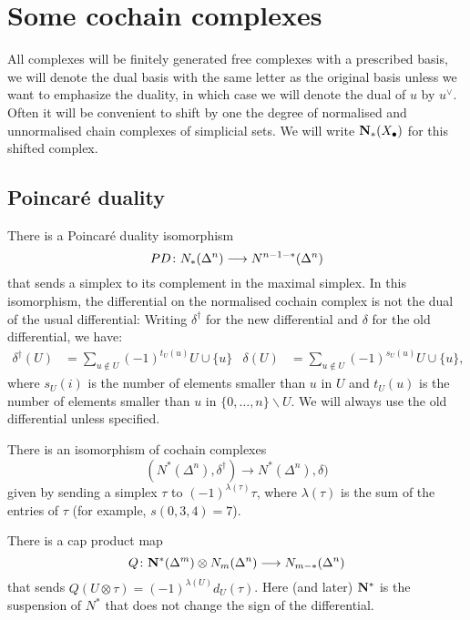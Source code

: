 
\section{Some cochain complexes}


All complexes will be finitely generated free complexes with a prescribed basis, we will denote the dual basis with the same letter as the original basis unless we want to emphasize the duality, in which case we will denote the dual of $u$ by $u^\vee$. Often it will be convenient to shift by one the degree of normalised and unnormalised chain complexes of simplicial sets. We will write $\mathbf{N}_*(X_\bullet)$ for this shifted complex.

\subsection{Poincaré duality}
There is a Poincaré duality isomorphism
\[PD\colon N_*(\Delta^n)\longrightarrow N^{n-1-*}(\Delta^n)\]
that sends a simplex to its complement in the maximal simplex. In this isomorphism, the differential on the normalised cochain complex is not the dual of the usual differential: Writing $\delta^\dagger$ for the new differential and $\delta$ for the old differential, we have:
\begin{align*}
    \delta^\dagger(U) &= \sum_{u\notin U} (-1)^{t_U(u)}U\cup \{u\}
    &
    \delta(U) &= \sum_{u\notin U}(-1)^{s_U(u)}U\cup \{u\},
\end{align*}
where $s_U(i)$ is the number of elements smaller than $u$ in $U$ and $t_U(u)$ is the number of elements smaller than $u$ in $\{0,\ldots,n\}\smallsetminus U$. We will always use the old differential unless specified.

There is an isomorphism of cochain complexes
\[(N^*(\Delta^n),\delta^\dagger)\longrightarrow N^*(\Delta^n),\delta)\]
given by sending a simplex $\tau$ to $(-1)^{\lambda(\tau)}\tau$, where $ \lambda(\tau)$ is the sum of the entries of $\tau$ (for example, $s(0,3,4) = 7$).

There is a cap product map
\[Q\colon \mathbf{N}^*(\Delta^m)\otimes N_m(\Delta^n)\longrightarrow N_{m-*}(\Delta^n)\]
that sends $Q(U\otimes \tau) = (-1)^{\lambda(U)}d_U(\tau)$. Here (and later) $\mathbf{N}^*$ is the suspension of $N^*$ that does not change the sign of the differential.

